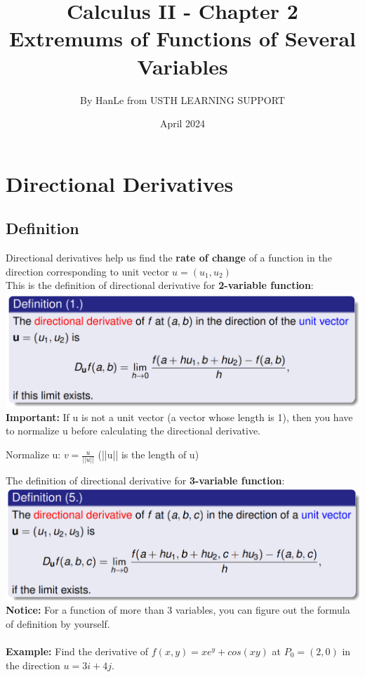 \documentclass{article}
\title{Calculus II - Chapter 2\\Extremums of Functions of Several Variables}
\author{By HanLe from USTH LEARNING SUPPORT}
\date{April 2024}
\begin{document}
\maketitle
\tableofcontents
\newpage
\section{Directional Derivatives}
\subsection{Definition}
Directional derivatives help us find the \textbf{rate of change} of a function in the direction corresponding to unit vector $u = (u_1, u_2)$\\
This is the definition of directional derivative for \textbf{2-variable function}:\\
\includegraphics[width=1\linewidth]{image.png}
\textbf{Important:} If u is not a unit vector (a vector whose length is 1), then you have to normalize u before calculating the directional derivative.
\begin{center}
    Normalize u: $v=\displaystyle\frac{u}{||u||}$ (||u|| is the length of u)
\end{center}
The definition of directional derivative for \textbf{3-variable function}:\\
\includegraphics[width=1\linewidth]{1.1.png}
\textbf{Notice:} For a function of more than 3 variables, you can figure out the formula of definition by yourself.\\\\
\textbf{Example: } Find the derivative of $f(x,y)=xe^y+cos(xy)$ at $P_0=(2,0)$ in the direction $u=3i+4j$.
\end{document}
